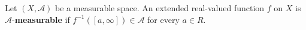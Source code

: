 Let $(X, \mathcal{A})$ be a measurable space. An extended real-valued function $f$ on $X$ is $\mathcal{A}$-\textbf{measurable} if $f^{-1}([a, \infty]) \in \mathcal{A}$ for every $a \in R$.
